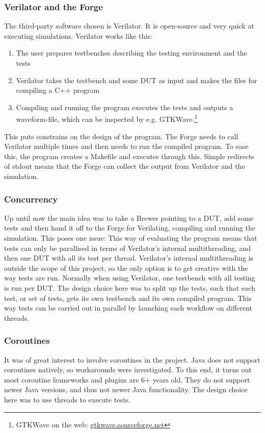 \subsubsection{Verilator and the Forge}
The third-party software chosen is Verilator. It is open-source and very quick at executing simulations. Verilator works like this:
\begin{enumerate}
    \item The user prepares testbenches describing the testing environment and the tests
    \item Verilator takes the testbench and some DUT as input and makes the files for compiling a C++ program
    \item Compiling and running the program executes the tests and outputs a waveform-file, which can be inspected by e.g. GTKWave.\footnote{GTKWave on the web: \href{https://gtkwave.sourceforge.net/}{gtkwave.sourceforge.net}}
\end{enumerate}

This puts constrains on the design of the program. The Forge needs to call Verilator multiple times and then needs to run the compiled program. To ease this, the program creates a Makefile and executes through this. Simple redirects of stdout means that the Forge can collect the output from Verilator and the simulation.
\subsubsection{Concurrency}
Up until now the main idea was to take a Brewer pointing to a DUT, add some tests and then hand it off to the Forge for Verilating, compiling and running the simulation. This poses one issue: This way of evaluating the program means that tests can only be parallised in terms of Verilator's internal multithreading, and then one DUT with all its test per thread. Verilator's internal multithreading is outside the scope of this project, so the only option is to get creative with the way tests are run. Normally when using Verilator, one testbench with all testing is run per DUT. The design choice here was to split up the tests, such that each test, or set of tests, gets its own testbench and its own compiled program. This way tests can be carried out in parallel by launching each workflow on different threads.
\subsubsection{Coroutines}
It was of great interest to involve coroutines in the project. Java does not support coroutines natively, so workarounds were investigated. To this end, it turns out most coroutine frameworks and plugins are 6+ years old. They do not support newer Java versions, and thus not newer Java functionality. The design choice here was to use threads to execute tests.
